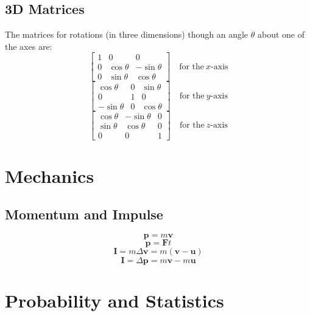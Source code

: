     \subsection{3D Matrices}
        The matrices for rotations (in three dimensions) though an angle $\theta$ about one of the axes are:
        \begin{equation}
            \begin{bmatrix}
                1 & 0 & 0 \\
                0 & \cos\theta & -\sin\theta \\
                0 & \sin\theta & \cos\theta
            \end{bmatrix}
            \quad\text{for the}\ x\text{-axis}
        \end{equation}
        \begin{equation}
            \begin{bmatrix}
                \cos\theta & 0 & \sin\theta \\
                0 & 1 & 0 \\
                -\sin\theta & 0 & \cos\theta
            \end{bmatrix}
            \quad\text{for the}\ y\text{-axis}
        \end{equation}
        \begin{equation}
            \begin{bmatrix}
                \cos\theta & -\sin\theta & 0 \\
                \sin\theta & \cos\theta & 0 \\
                0 & 0 & 1
            \end{bmatrix}
            \quad\text{for the}\ z\text{-axis}
        \end{equation}
    
    \section{Mechanics}
        \subsection{Momentum and Impulse}
        \begin{equation} \label{eq:momentum_m_v}
            \textbf{p}=m\textbf{v}
        \end{equation}
        \begin{equation} \label{eq:momentum_f_t}
            \textbf{p}=\textbf{F}t
        \end{equation}
        \begin{equation} \label{eq:impulse_m_delta_v}
            \textbf{I}=m\Delta\textbf{v}=m(\textbf{v}-\textbf{u})
        \end{equation}
        \begin{equation} \label{eq:imulse_delta_p}
            \textbf{I}=\Delta\textbf{p}=m\textbf{v}-m\textbf{u}
        \end{equation}

    \section{Probability and Statistics}